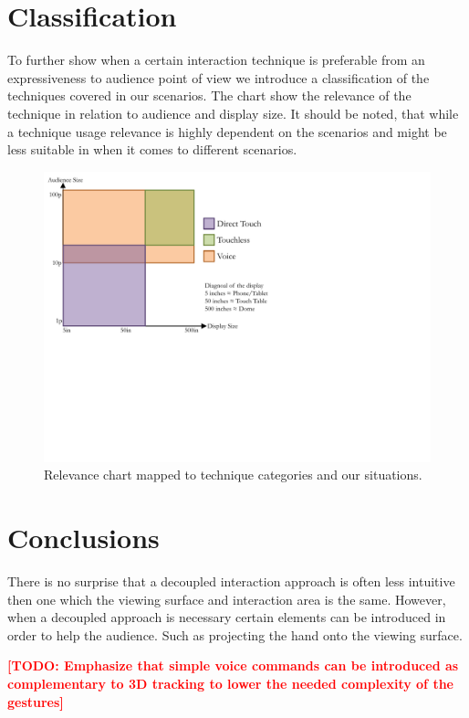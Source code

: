 \documentclass[review,journal]{vgtc}         %
\newcommand{\todo}[1]{\textbf{\textcolor{red}{[TODO: {#1}]}}}
\begin{document}
\section{Classification}

To further show when a certain interaction technique is preferable from an expressiveness to audience point of view we introduce a classification of the techniques covered in our scenarios. The chart show the relevance of the technique in relation to audience and display size. It should be noted, that while a technique usage relevance is highly dependent on the scenarios and might be less suitable in when it comes to different scenarios.

\begin{figure}[htb]
	\centering
	\includegraphics[width=1.0\linewidth]{classifiy_diagram.pdf}
	\caption{Relevance chart mapped to technique categories and our situations.}
	\label{classifiy_diagram}
\end{figure}

\section{Conclusions}\label{sec:conclusion}

There is no surprise that a decoupled interaction approach is often less intuitive then one which the viewing surface and interaction area is the same.
However, when a decoupled approach is necessary certain elements can be introduced in order to help the audience.
Such as projecting the hand onto the viewing surface.

\todo{Emphasize that simple voice commands can be introduced as complementary to 3D tracking to lower the needed complexity of the gestures}
\end{document}
